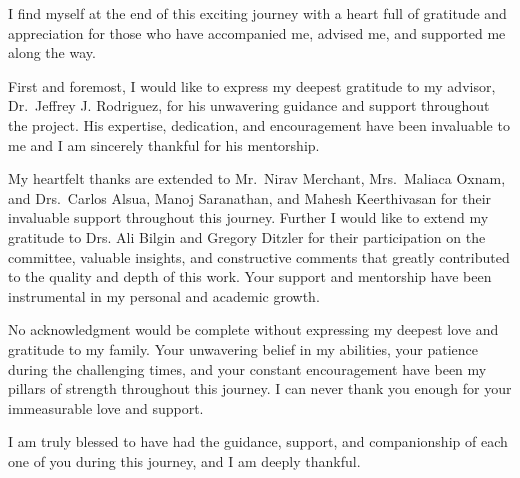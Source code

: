 I find myself at the end of this exciting journey with a heart full of gratitude and appreciation for those who have accompanied me, advised me, and supported me along the way.

First and foremost, I would like to express my deepest gratitude to my advisor, Dr.\ Jeffrey J. Rodriguez, for his unwavering guidance and support throughout the project. His expertise, dedication, and encouragement have been invaluable to me and I am sincerely thankful for his mentorship.

My heartfelt thanks are extended to Mr.\ Nirav Merchant, Mrs.\ Maliaca Oxnam, and Drs.\ Carlos Alsua, Manoj Saranathan, and Mahesh Keerthivasan for their invaluable support throughout this journey. Further I would like to extend my gratitude to Drs. Ali Bilgin and Gregory Ditzler for their participation on the committee, valuable insights, and constructive comments that greatly contributed to the quality and depth of this work. Your support and mentorship have been instrumental in my personal and academic growth.

No acknowledgment would be complete without expressing my deepest love and gratitude to my family. Your unwavering belief in my abilities, your patience during the challenging times, and your constant encouragement have been my pillars of strength throughout this journey. I can never thank you enough for your immeasurable love and support.

I am truly blessed to have had the guidance, support, and companionship of each one of you during this journey, and I am deeply thankful.
